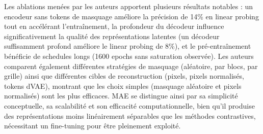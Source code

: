 Les ablations menées par les auteurs apportent plusieurs résultats notables : un encodeur sans tokens de masquage améliore la précision de 14\% en linear probing tout en accélérant l'entraînement, la profondeur du décodeur influence significativement la qualité des représentations latentes (un décodeur suffisamment profond améliore le linear probing de 8\%), et le pré-entraînement bénéficie de schedules longs (1600 epochs sans saturation observée). Les auteurs comparent également différentes stratégies de masquage (aléatoire, par blocs, par grille) ainsi que différentes cibles de reconstruction (pixels, pixels normalisés, tokens dVAE), montrant que les choix simples (masquage aléatoire et pixels normalisés) sont les plus efficaces. MAE se distingue ainsi par sa simplicité conceptuelle, sa scalabilité et son efficacité computationnelle, bien qu'il produise des représentations moins linéairement séparables que les méthodes contrastives, nécessitant un fine-tuning pour être pleinement exploité.